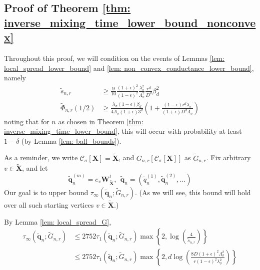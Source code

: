 \documentclass{article}
\newcommand{\1}{\mathbf{1}}
\newcommand{\qbf}{\mathbf{q}}
\newcommand{\Xbf}{\mathbf{X}}
\newcommand{\Wbf}{\mathbf{W}}
\newcommand{\Cset}{\mathcal{C}}
\newcommand{\Csig}{\Cset_{\sigma}}
\newcommand{\wX}{\widetilde{\Xbf}}
\theoremstyle{aldenthm}
\begin{document}
\subsection{Proof of Theorem \ref{thm: inverse_mixing_time_lower_bound_nonconvex}}
\label{sec: inverse_mixing_time_lower_bound_nonconvex}

Throughout this proof, we will condition on the events of Lemmas \ref{lem: local_spread_lower_bound} and \ref{lem: non_convex_conductance_lower_bound},
namely
\begin{align*}
\widetilde{s}_{n,r} & \geq \frac{9}{10} \frac{(1 + \epsilon)^2}{(1 - \epsilon)^2}\frac{\lambda_{\sigma}^2}{\Lambda_{\sigma}^2} \frac{r^d}{D^d} \beta_d^2 \\
\widetilde{\Phi}_{n,r}(1/2) & \geq \frac{\lambda_{\sigma}(1 - \epsilon)\beta_d}{4\Lambda_{\sigma}(1 + \epsilon)3^d} \left(1 + \frac{(1 - \epsilon)r^d\lambda_{\sigma}}{(1 + \epsilon)D^d\Lambda_{\sigma}}\right)
\end{align*}
noting that for $n$ as chosen in Theorem \ref{thm: inverse_mixing_time_lower_bound}, this will occur with probability at least $1 - \delta$ (by Lemma \ref{lem: ball_bounds}).

As a reminder, we write $\Csig[\Xbf] = \wX$, and $G_{n,r}[\Csig[\Xbf]]$ as $\widetilde{G}_{n,r}$. Fix arbitrary $v \in \wX$, and let
\begin{equation*}
\widetilde{\qbf}_n^{(m)} = e_v \Wbf_{\wX}^t, ~~ \widetilde{\qbf}_n = (\widetilde{q}_n^{(1)}, \widetilde{\qbf}_n^{(2)}, \ldots)
\end{equation*}
Our goal is to upper bound $\tau_{\infty}(\widetilde{\qbf}_n; \widetilde{G}_{n,r})$. (As we will see, this bound will hold over all such starting vertices $v \in \wX$.)

By Lemma \ref{lem: local_spread_G},
\begin{align*}
\tau_{\infty}(\widetilde{\qbf}_n; \widetilde{G}_{n,r}) & \leq 2752 \tau_{1}(\widetilde{\qbf}_n; \widetilde{G}_{n,r}) \max\left\{2, \log\left(\frac{4}{\widetilde{s}_{n,r}}\right) \right\} \nonumber \\
& \leq 2752 \tau_{1}(\widetilde{\qbf}_n; \widetilde{G}_{n,r}) \max\left\{2, d\log\left(\frac{8 D (1 + \epsilon)^2 \Lambda_{\sigma}^2}{r (1 - \epsilon)^2 \lambda_{\sigma}^2}\right) \right\}
\end{align*} 
\end{document}
